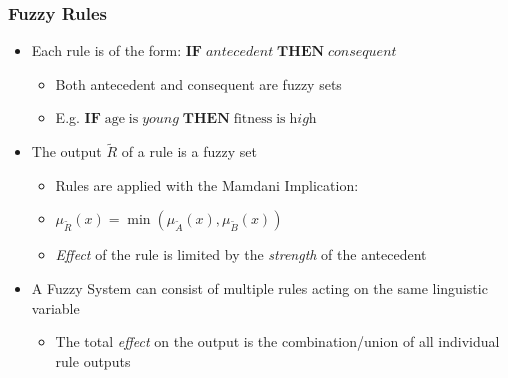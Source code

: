 \documentclass[
	10pt,
	t		%
]{beamer}
\begin{document}
\begin{frame}
	\frametitle{Fuzzy Rules}
	\begin{itemize}
		\item Each rule is of the form: $\textbf{IF} \; {antecedent} \; \textbf{THEN} \; {consequent}$
		      \begin{itemize}
			      \item Both antecedent and consequent are fuzzy sets
			      \item E.g. $\textbf{IF} \; \text{age} \; \text{is} \; \textit{young} \; \textbf{THEN} \; \text{fitness} \; \text{is} \; \textit{high}$
		      \end{itemize}
		\item The output $\tilde{R}$ of a rule is a fuzzy set
		      \begin{itemize}
			      \item Rules are applied with the Mamdani Implication:
			      \item $\mu_{\tilde{R}}(x) = \min(\mu_{\tilde{A}}(x), \mu_{\tilde{B}}(x))$
			      \item \textit{Effect} of the rule is limited by the \textit{strength} of the antecedent
		      \end{itemize}
		\item A Fuzzy System can consist of multiple rules acting on the same linguistic variable
		      \begin{itemize}
			      \item The total \textit{effect} on the output is the combination/union of all individual rule outputs
		      \end{itemize}
	\end{itemize}
\end{frame}
\end{document}
